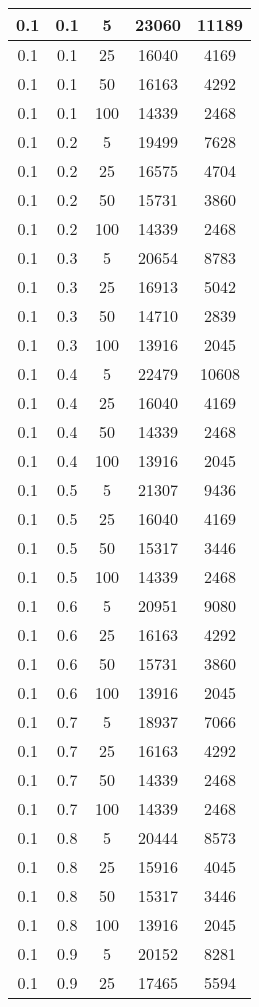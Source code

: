 \begin{appendices}
\begin{longtable}[c]{|c|c|c|c|c|}
	0.1& 0.1& 5& 23060&  11189\\
	\hline
	0.1& 0.1& 25& 16040&  4169\\
	\hline
	0.1& 0.1& 50& 16163&  4292\\
	\hline
	0.1& 0.1& 100& 14339&  2468\\
	\hline
	0.1& 0.2& 5& 19499&  7628\\
	\hline
	0.1& 0.2& 25& 16575&  4704\\
	\hline
	0.1& 0.2& 50& 15731&  3860\\
	\hline
	0.1& 0.2& 100& 14339&  2468\\
	\hline
	0.1& 0.3& 5& 20654&  8783\\
	\hline
	0.1& 0.3& 25& 16913&  5042\\
	\hline
	0.1& 0.3& 50& 14710&  2839\\
	\hline
	0.1& 0.3& 100& 13916&  2045\\
	\hline
	0.1& 0.4& 5& 22479&  10608\\
	\hline
	0.1& 0.4& 25& 16040&  4169\\
	\hline
	0.1& 0.4& 50& 14339&  2468\\
	\hline
	0.1& 0.4& 100& 13916&  2045\\
	\hline
	0.1& 0.5& 5& 21307&  9436\\
	\hline
	0.1& 0.5& 25& 16040&  4169\\
	\hline
	0.1& 0.5& 50& 15317&  3446\\
	\hline
	0.1& 0.5& 100& 14339&  2468\\
	\hline
	0.1& 0.6& 5& 20951&  9080\\
	\hline
	0.1& 0.6& 25& 16163&  4292\\
	\hline
	0.1& 0.6& 50& 15731&  3860\\
	\hline
	0.1& 0.6& 100& 13916&  2045\\
	\hline
	0.1& 0.7& 5& 18937&  7066\\
	\hline
	0.1& 0.7& 25& 16163&  4292\\
	\hline
	0.1& 0.7& 50& 14339&  2468\\
	\hline
	0.1& 0.7& 100& 14339&  2468\\
	\hline
	0.1& 0.8& 5& 20444&  8573\\
	\hline
	0.1& 0.8& 25& 15916&  4045\\
	\hline
	0.1& 0.8& 50& 15317&  3446\\
	\hline
	0.1& 0.8& 100& 13916&  2045\\
	\hline
	0.1& 0.9& 5& 20152&  8281\\
	\hline
	0.1& 0.9& 25& 17465&  5594\\

\end{longtable}
\end{appendices}
